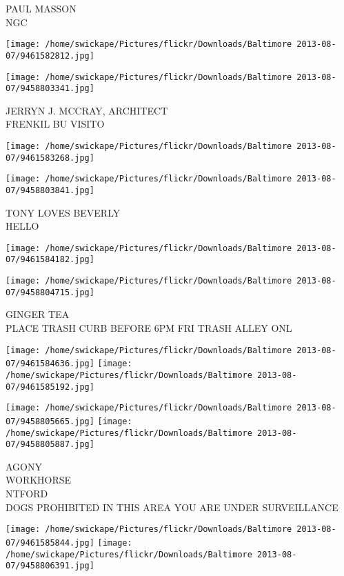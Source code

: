 \documentclass[10pt,letterpaper]{article}
\begin{document}
PAUL MASSON\\
NGC
\pagebreak

\texttt{[image: /home/swickape/Pictures/flickr/Downloads/Baltimore 2013-08-07/9461582812.jpg]}

\vspace{0.25in}
\texttt{[image: /home/swickape/Pictures/flickr/Downloads/Baltimore 2013-08-07/9458803341.jpg]}

JERRYN J. MCCRAY, ARCHITECT\\
FRENKIL BU VISITO
\pagebreak

\texttt{[image: /home/swickape/Pictures/flickr/Downloads/Baltimore 2013-08-07/9461583268.jpg]}

\vspace{0.25in}
\texttt{[image: /home/swickape/Pictures/flickr/Downloads/Baltimore 2013-08-07/9458803841.jpg]}

TONY LOVES BEVERLY\\
HELLO
\pagebreak

\texttt{[image: /home/swickape/Pictures/flickr/Downloads/Baltimore 2013-08-07/9461584182.jpg]}

\vspace{0.25in}
\texttt{[image: /home/swickape/Pictures/flickr/Downloads/Baltimore 2013-08-07/9458804715.jpg]}

GINGER TEA\\
PLACE TRASH CURB BEFORE 6PM FRI TRASH ALLEY ONL
\pagebreak

\texttt{[image: /home/swickape/Pictures/flickr/Downloads/Baltimore 2013-08-07/9461584636.jpg]}
\texttt{[image: /home/swickape/Pictures/flickr/Downloads/Baltimore 2013-08-07/9461585192.jpg]}

\texttt{[image: /home/swickape/Pictures/flickr/Downloads/Baltimore 2013-08-07/9458805665.jpg]}
\texttt{[image: /home/swickape/Pictures/flickr/Downloads/Baltimore 2013-08-07/9458805887.jpg]}

AGONY\\
WORKHORSE\\
NTFORD\\
DOGS PROHIBITED IN THIS AREA YOU ARE UNDER SURVEILLANCE
\pagebreak

\texttt{[image: /home/swickape/Pictures/flickr/Downloads/Baltimore 2013-08-07/9461585844.jpg]}
\texttt{[image: /home/swickape/Pictures/flickr/Downloads/Baltimore 2013-08-07/9458806391.jpg]}
\end{document}
